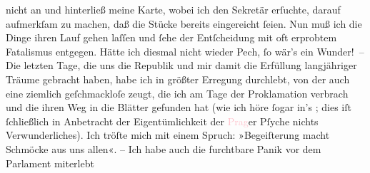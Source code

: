                     nicht an und hinterließ meine Karte, wobei ich den Sekretär erſuchte, darauf
                    aufmerkſam zu machen, daß die Stücke bereits eingereicht ſeien.\pend
           \pstart
           Nun muß ich die Dinge ihren Lauf gehen laſſen und ſehe der Entſcheidung mit oft
                    erprobtem Fatalismus entgegen. Hätte ich diesmal nicht wieder Pech, ſo wär’s ein
                    Wunder! –\pend
           \pstart
           Die letzten Tage, die uns die Republik und mir damit die Erfüllung langjähriger
                    Träume gebracht haben, habe ich in größter Erregung durchlebt, von der auch eine
                    ziemlich geſchmackloſe \label{K_L02311_1v}\label{K_L02311_1h} zeugt, die ich am Tage der Proklamation verbrach und {\pb}die ihren Weg in die Blätter gefunden hat (wie ich
                    höre ſogar in’s \label{K_L02311_2v}\label{K_L02311_2h}; dies iſt ſchließlich in Anbetracht
                    der Eigentümlichkeit der \textcolor{pink}{Prag}{}\ledrightnote{\textcolor{pink}{Prag}}er Pſyche nichts
                    Verwunderliches). Ich tröſte mich mit einem Spruch: »Begeiſterung macht Schmöcke
                    aus uns allen«. – Ich habe auch die furchtbare Panik vor dem Parlament miterlebt
